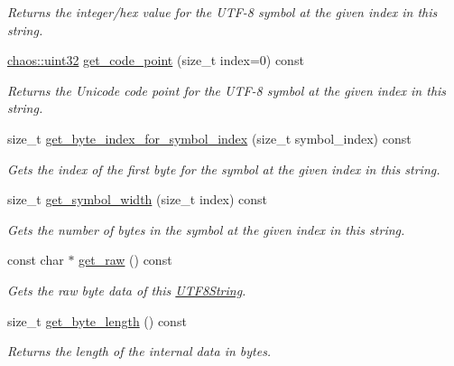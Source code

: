 \begin{DoxyCompactItemize}
\begin{DoxyCompactList}\small\item\em Returns the integer/hex value for the U\-T\-F-\/8 symbol at the given index in this string. \end{DoxyCompactList}\item 
\hyperlink{namespacechaos_a8641b3ae4551f0b35570d4f9f4ec22d9}{chaos\-::uint32} \hyperlink{classchaos_1_1uni_1_1_u_t_f8_string_a0032f18868d33ca5f5855657c4d2d147}{get\-\_\-code\-\_\-point} (size\-\_\-t index=0) const 
\begin{DoxyCompactList}\small\item\em Returns the Unicode code point for the U\-T\-F-\/8 symbol at the given index in this string. \end{DoxyCompactList}\item 
size\-\_\-t \hyperlink{classchaos_1_1uni_1_1_u_t_f8_string_a54d7b7377d4f22b593dc072e8e929529}{get\-\_\-byte\-\_\-index\-\_\-for\-\_\-symbol\-\_\-index} (size\-\_\-t symbol\-\_\-index) const 
\begin{DoxyCompactList}\small\item\em Gets the index of the first byte for the symbol at the given index in this string. \end{DoxyCompactList}\item 
size\-\_\-t \hyperlink{classchaos_1_1uni_1_1_u_t_f8_string_af69ae3c678c01e516d9da2cdca745613}{get\-\_\-symbol\-\_\-width} (size\-\_\-t index) const 
\begin{DoxyCompactList}\small\item\em Gets the number of bytes in the symbol at the given index in this string. \end{DoxyCompactList}\item 
const char $\ast$ \hyperlink{classchaos_1_1uni_1_1_u_t_f8_string_a91d3bb4cfbfb573b3fa6ecf3312f4dee}{get\-\_\-raw} () const 
\begin{DoxyCompactList}\small\item\em Gets the raw byte data of this \hyperlink{classchaos_1_1uni_1_1_u_t_f8_string}{U\-T\-F8\-String}. \end{DoxyCompactList}\item 
size\-\_\-t \hyperlink{classchaos_1_1uni_1_1_u_t_f8_string_ac8a4220ca85f798c27396666b2568c95}{get\-\_\-byte\-\_\-length} () const 
\begin{DoxyCompactList}\small\item\em Returns the length of the internal data in bytes. \end{DoxyCompactList}\item 

\end{DoxyCompactItemize}
